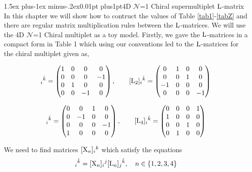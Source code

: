 \documentclass[12pt]{article}
\makeatletter
\def\rL{{\rm L}}
\let\bm\relax
\newcommand{\bm}[1]{{\boldsymbol{#1}}}
\def\subsection{\@startsection{subsection}{2}{\z@}
         {1.5ex plus-1ex minus-.2ex}{0.01pt plus1pt}{\sf\slshape}}
\makeatother
\begin{document}
\subsection{4D $\mathcal{N}$=1 Chiral supermultiplet ${\bm \rL}$-matrix}
In this chapter we will show how to contruct the values of Table \ref{tab1}-\ref{tabZ} and there are regular matrix multiplication rules between the ${\bm \rL}$-matrices. 
We will use the 4D $\mathcal{N}$=1 Chiral multiplet as a toy model.
Firstly, we gave the ${\bm \rL}$-matrices in a
compact form in Table 1 which using our conventions led to
the ${\bm \rL}$-matrices for the chiral multiplet given as, \cite{3}

\begin{equation}
[{\bm \rL}_1]_{i}{}^{\hat k}=
\begin{pmatrix}
1 & 0 & 0 & 0 \\
0 & 0 & 0 & -1 \\
0 & 1 & 0 & 0 \\
0 & 0 & -1 & 0 \\
\end{pmatrix},\quad\quad
[{\bm \rL}_2]_{i}{}^{\hat k}=
\begin{pmatrix}
0 & 1 & 0 & 0 \\
0 & 0 & 1 & 0 \\
-1 & 0 & 0 & 0 \\
0 & 0 & 0 & -1 \\
\end{pmatrix}
\end{equation}

\begin{equation}
[{\bm \rL}_3]_{i}{}^{\hat k}=
\begin{pmatrix}
0 & 0 & 1 & 0 \\
0 & -1 & 0 & 0 \\
0 & 0 & 0 & -1 \\
1 & 0 & 0 & 0 \\
\end{pmatrix}
,\quad\quad
[{\bm \rL}_4]_{i}{}^{\hat k}=
\begin{pmatrix}
0 & 0 & 0 & 1 \\
1 & 0 & 0 & 0 \\
0 & 0 & 1 & 0 \\
0 & 1 & 0 & 0 \\
\end{pmatrix}
\end{equation}

We need to find matrices $[{\bm{\rm X}}_n]_{i}{}^{k}$ which satisfy the
equations
\begin{equation}
[{\bm \rL}_{n+1}]_{i}{}^{\hat k}=[{\bm{\rm X}}_n]_{i}{}^{j}[{\bm \rL}_n]_{j}{}^{\hat k},\quad n\in\{1,2,3,4\}
\label{eq3}
\end{equation}
\end{document}
